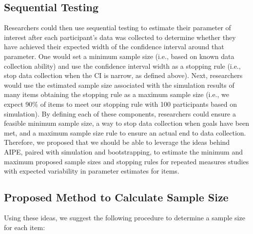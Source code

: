 \documentclass[
  man]{apa7}
\begin{document}
\hypertarget{sequential-testing}{%
\subsection{Sequential Testing}\label{sequential-testing}}

Researchers could then use sequential testing to estimate their parameter of interest after each participant's data was collected to determine whether they have achieved their expected width of the confidence interval around that parameter. One would set a minimum sample size (i.e., based on known data collection ability) and use the confidence interval width as a stopping rule (i.e., stop data collection when the CI is narrow, as defined above). Next, researchers would use the estimated sample size associated with the simulation results of many items obtaining the stopping rule as a maximum sample size (i.e., we expect 90\% of items to meet our stopping rule with 100 participants based on simulation). By defining each of these components, researchers could ensure a feasible minimum sample size, a way to stop data collection when goals have been met, and a maximum sample size rule to ensure an actual end to data collection. Therefore, we proposed that we should be able to leverage the ideas behind AIPE, paired with simulation and bootstrapping, to estimate the minimum and maximum proposed sample sizes and stopping rules for repeated measures studies with expected variability in parameter estimates for items.

\hypertarget{proposed-method-to-calculate-sample-size}{%
\subsection{Proposed Method to Calculate Sample Size}\label{proposed-method-to-calculate-sample-size}}

Using these ideas, we suggest the following procedure to determine a sample size for each item:
\end{document}
